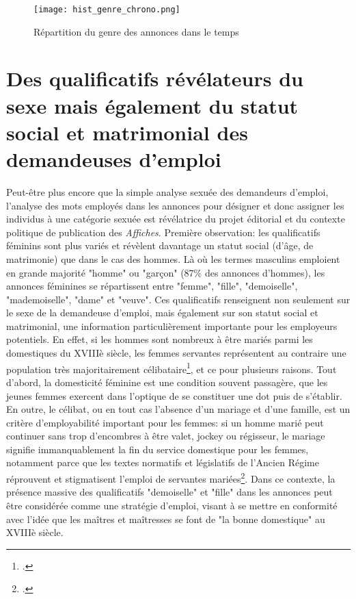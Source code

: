 \begin{figure}[h]
	\centering
	\texttt{[image: hist\_genre\_chrono.png]}
	\caption{Répartition du genre des annonces dans le temps}
\end{figure}



\section{Des qualificatifs révélateurs du sexe mais également du statut social et matrimonial des demandeuses d'emploi}

Peut-être plus encore que la simple analyse sexuée des demandeurs d'emploi, l'analyse des mots employés dans les annonces pour désigner et donc assigner les individus à une catégorie sexuée est révélatrice du projet éditorial et du contexte politique de publication des \textit{Affiches}. Première observation: les qualificatifs féminins sont plus variés et révèlent davantage un statut social (d'âge, de matrimonie) que dans le cas des hommes. Là où les termes masculins emploient en grande majorité "homme" ou "garçon" (87\% des annonces d'hommes), les annonces féminines se répartissent entre "femme", "fille", "demoiselle", "mademoiselle", "dame" et "veuve". Ces qualificatifs renseignent non seulement sur le sexe de la demandeuse d'emploi, mais également sur son statut social et matrimonial, une information particulièrement importante pour les employeurs potentiels. En effet, si les hommes sont nombreux à être mariés parmi les domestiques du XVIIIè siècle, les femmes servantes représentent au contraire une population très majoritairement célibataire\footcites[p.79]{mazaServantsMastersEighteenthcentury1983}, et ce pour plusieurs raisons. Tout d'abord, la domesticité féminine est une condition souvent passagère, que les jeunes femmes exercent dans l'optique de se constituer une dot puis de s'établir. En outre, le célibat, ou en tout cas l'absence d'un mariage et d'une famille, est un critère d'employabilité important pour les femmes: si un homme marié peut continuer sans trop d'encombres à être valet, jockey ou régisseur, le mariage signifie immanquablement la fin du service domestique pour les femmes, notamment parce que les textes normatifs et législatifs de l'Ancien Régime réprouvent et stigmatisent l'emploi de servantes mariées\footcites[p.78]{mazaServantsMastersEighteenthcentury1983}. Dans ce contexte, la présence massive des qualificatifs "demoiselle" et "fille" dans les annonces peut être considérée comme une stratégie d'emploi, visant à se mettre en conformité avec l'idée que les maîtres et maîtresses se font de "la bonne domestique" au XVIIIè siècle.

